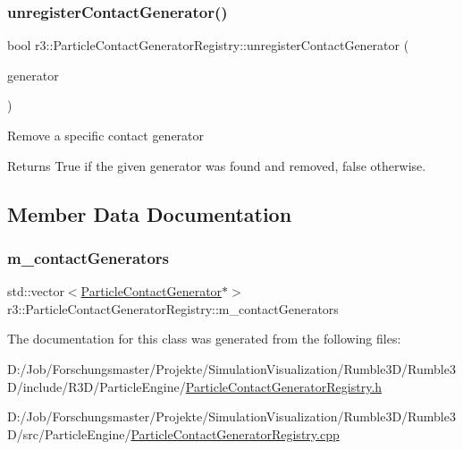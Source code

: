 \subsubsection{\texorpdfstring{unregister\+Contact\+Generator()}{unregisterContactGenerator()}}
{\footnotesize\ttfamily bool r3\+::\+Particle\+Contact\+Generator\+Registry\+::unregister\+Contact\+Generator (\begin{DoxyParamCaption}\item[{\mbox{\hyperlink{classr3_1_1_particle_contact_generator}{Particle\+Contact\+Generator}} $\ast$}]{generator }\end{DoxyParamCaption})}

Remove a specific contact generator \begin{DoxyReturn}{Returns}
True if the given generator was found and removed, false otherwise. 
\end{DoxyReturn}


\subsection{Member Data Documentation}
\mbox{\label{classr3_1_1_particle_contact_generator_registry_abefd730c20539681ed0fac53ccd5f8ab}} 
\subsubsection{\texorpdfstring{m\+\_\+contact\+Generators}{m\_contactGenerators}}
{\footnotesize\ttfamily std\+::vector$<$\mbox{\hyperlink{classr3_1_1_particle_contact_generator}{Particle\+Contact\+Generator}}$\ast$$>$ r3\+::\+Particle\+Contact\+Generator\+Registry\+::m\+\_\+contact\+Generators\hspace{0.3cm}{\ttfamily [protected]}}



The documentation for this class was generated from the following files\+:\begin{DoxyCompactItemize}
\item 
D\+:/\+Job/\+Forschungsmaster/\+Projekte/\+Simulation\+Visualization/\+Rumble3\+D/\+Rumble3\+D/include/\+R3\+D/\+Particle\+Engine/\mbox{\hyperlink{_particle_contact_generator_registry_8h}{Particle\+Contact\+Generator\+Registry.\+h}}\item 
D\+:/\+Job/\+Forschungsmaster/\+Projekte/\+Simulation\+Visualization/\+Rumble3\+D/\+Rumble3\+D/src/\+Particle\+Engine/\mbox{\hyperlink{_particle_contact_generator_registry_8cpp}{Particle\+Contact\+Generator\+Registry.\+cpp}}\end{DoxyCompactItemize}
